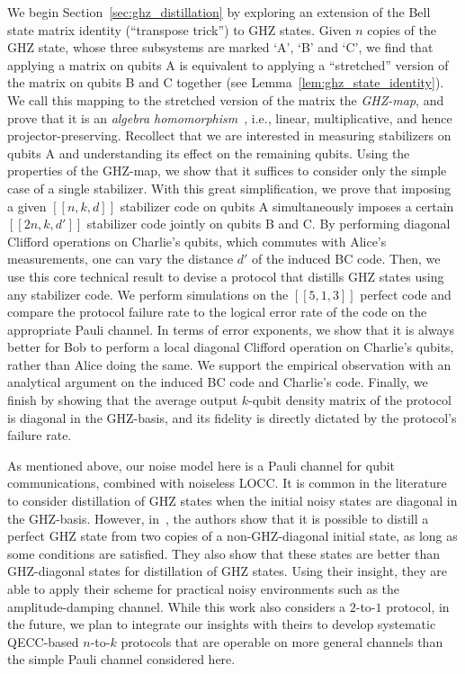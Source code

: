 \documentclass[journal,onecolumn]{IEEEtran}
\newcommand{\llbr}{[\![}
\newcommand{\rrbr}{]\!]}
\begin{document}
We begin Section~\ref{sec:ghz_distillation} by exploring an extension of the Bell state matrix identity (``transpose trick'') to GHZ states.
Given $n$ copies of the GHZ state, whose three subsystems are marked `A', `B' and `C', we find that applying a matrix on qubits A is equivalent to applying a ``stretched'' version of the matrix on qubits B and C together (see Lemma~\ref{lem:ghz_state_identity}).
We call this mapping to the stretched version of the matrix the \emph{GHZ-map}, and prove that it is an \emph{algebra homomorphism}~\cite{Dummit-2004}, i.e., linear, multiplicative, and hence projector-preserving.
Recollect that we are interested in measuring stabilizers on qubits A and understanding its effect on the remaining qubits.
Using the properties of the GHZ-map, we show that it suffices to consider only the simple case of a single stabilizer.
With this great simplification, we prove that imposing a given $\llbr n,k,d \rrbr$ stabilizer code on qubits A simultaneously imposes a certain $\llbr 2n, k, d' \rrbr$ stabilizer code jointly on qubits B and C.
By performing diagonal Clifford operations on Charlie's qubits, which commutes with Alice's measurements, one can vary the distance $d'$ of the induced BC code.
Then, we use this core technical result to devise a protocol that distills GHZ states using any stabilizer code.
We perform simulations on the $\llbr 5,1,3 \rrbr$ perfect code and compare the protocol failure rate to the logical error rate of the code on the appropriate Pauli channel. 
In terms of error exponents, we show that it is always better for Bob to perform a local diagonal Clifford operation on Charlie's qubits, rather than Alice doing the same.
We support the empirical observation with an analytical argument on the induced BC code and Charlie's code.
Finally, we finish by showing that the average output $k$-qubit density matrix of the protocol is diagonal in the GHZ-basis, and its fidelity is directly dictated by the protocol's failure rate.

As mentioned above, our noise model here is a Pauli channel for qubit communications, combined with noiseless LOCC.
It is common in the literature to consider distillation of GHZ states when the initial noisy states are diagonal in the GHZ-basis.
However, in~\cite{Wang-oc17}, the authors show that it is possible to distill a perfect GHZ state from two copies of a non-GHZ-diagonal initial state, as long as some conditions are satisfied.
They also show that these states are better than GHZ-diagonal states for distillation of GHZ states.
Using their insight, they are able to apply their scheme for practical noisy environments such as the amplitude-damping channel.
While this work also considers a $2$-to-$1$ protocol, in the future, we plan to integrate our insights with theirs to develop systematic QECC-based $n$-to-$k$ protocols that are operable on more general channels than the simple Pauli channel considered here.
\end{document}
